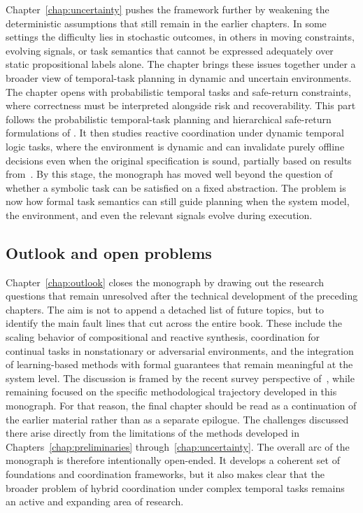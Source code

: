 Chapter~\ref{chap:uncertainty} pushes the framework further by weakening the
deterministic assumptions that still remain in the earlier chapters. In some
settings the difficulty lies in stochastic outcomes, in others in moving
constraints, evolving signals, or task semantics that cannot be expressed
adequately over static propositional labels alone. The chapter brings these
issues together under a broader view of temporal-task planning in dynamic and
uncertain environments.
The chapter opens with probabilistic temporal tasks and safe-return
constraints, where correctness must be interpreted alongside risk and
recoverability. This part follows the probabilistic temporal-task planning and
hierarchical safe-return formulations of
\citet{guo2018probabilistic,guo2023hierarchical}. It then studies reactive
coordination under dynamic temporal logic tasks, where the environment
is dynamic and can invalidate purely offline decisions
even when the original specification is sound, partially
based on results from~\citet{zhao2026umbrella}.
By this stage, the monograph has moved well beyond the question of whether a
symbolic task can be satisfied on a fixed abstraction. The problem is now how
formal task semantics can still guide planning when the system model, the
environment, and even the relevant signals evolve during execution.

\subsection{Outlook and open problems}
\label{sec:ch01:outline:outlook}

Chapter~\ref{chap:outlook} closes the monograph by drawing out the research
questions that remain unresolved after the technical development of the
preceding chapters. The aim is not to append a detached list of future topics,
but to identify the main fault lines that cut across the entire book. These
include the scaling behavior of compositional and reactive synthesis,
coordination for continual tasks in nonstationary or adversarial environments,
and the integration of learning-based methods with formal guarantees that
remain meaningful at the system level. The discussion is framed by the recent
survey perspective of~\citet{li2025survey}, while remaining focused on the
specific methodological trajectory developed in this monograph.
For that reason, the final chapter should be read as a continuation of the
earlier material rather than as a separate epilogue. The challenges discussed
there arise directly from the limitations of the methods developed in
Chapters~\ref{chap:preliminaries} through~\ref{chap:uncertainty}. The overall
arc of the monograph is therefore intentionally open-ended. It develops a
coherent set of foundations and coordination frameworks, but it also makes
clear that the broader problem of hybrid coordination under complex temporal
tasks remains an active and expanding area of research.


